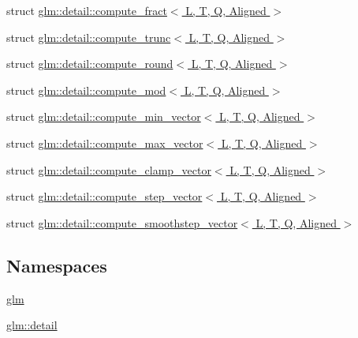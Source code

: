 \begin{DoxyCompactItemize}
\item 
struct \hyperlink{structglm_1_1detail_1_1compute__fract}{glm\+::detail\+::compute\+\_\+fract$<$ L, T, Q, Aligned $>$}
\item 
struct \hyperlink{structglm_1_1detail_1_1compute__trunc}{glm\+::detail\+::compute\+\_\+trunc$<$ L, T, Q, Aligned $>$}
\item 
struct \hyperlink{structglm_1_1detail_1_1compute__round}{glm\+::detail\+::compute\+\_\+round$<$ L, T, Q, Aligned $>$}
\item 
struct \hyperlink{structglm_1_1detail_1_1compute__mod}{glm\+::detail\+::compute\+\_\+mod$<$ L, T, Q, Aligned $>$}
\item 
struct \hyperlink{structglm_1_1detail_1_1compute__min__vector}{glm\+::detail\+::compute\+\_\+min\+\_\+vector$<$ L, T, Q, Aligned $>$}
\item 
struct \hyperlink{structglm_1_1detail_1_1compute__max__vector}{glm\+::detail\+::compute\+\_\+max\+\_\+vector$<$ L, T, Q, Aligned $>$}
\item 
struct \hyperlink{structglm_1_1detail_1_1compute__clamp__vector}{glm\+::detail\+::compute\+\_\+clamp\+\_\+vector$<$ L, T, Q, Aligned $>$}
\item 
struct \hyperlink{structglm_1_1detail_1_1compute__step__vector}{glm\+::detail\+::compute\+\_\+step\+\_\+vector$<$ L, T, Q, Aligned $>$}
\item 
struct \hyperlink{structglm_1_1detail_1_1compute__smoothstep__vector}{glm\+::detail\+::compute\+\_\+smoothstep\+\_\+vector$<$ L, T, Q, Aligned $>$}
\end{DoxyCompactItemize}
\subsection*{Namespaces}
\begin{DoxyCompactItemize}
\item 
 \hyperlink{namespaceglm}{glm}
\item 
 \hyperlink{namespaceglm_1_1detail}{glm\+::detail}
\end{DoxyCompactItemize}
